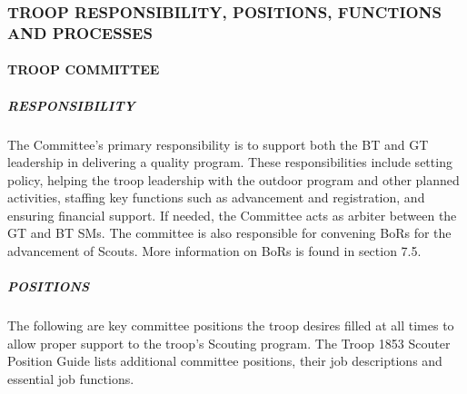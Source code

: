 \documentclass{ltxguide}
\begin{document}
\subsubsection{TROOP RESPONSIBILITY, POSITIONS, FUNCTIONS AND PROCESSES}
\paragraph{TROOP COMMITTEE}
\subparagraph{RESPONSIBILITY}
The Committee's primary responsibility is to support both the \ac{BT} and \ac{GT} leadership in delivering a quality program. These responsibilities include setting policy, helping the troop leadership with the outdoor program and other planned activities, staffing key functions such as advancement and registration, and ensuring financial support. If needed, the Committee acts as arbiter between the \ac{GT} and \ac{BT} \acp{SM}. The committee is also responsible for convening \acp{BoR}  for the advancement of Scouts. More information on \acp{BoR} is found in section 7.5. %

\subparagraph{POSITIONS}
The following are key committee positions the troop desires filled at all times to allow proper support to the troop's Scouting program. The Troop 1853 Scouter Position Guide lists additional committee positions, their job descriptions and essential job functions.
\end{document}
